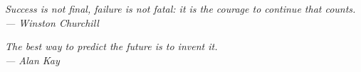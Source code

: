 \thispagestyle{empty}
\mbox{}
\begin{flushright}

{\selectfont
  \vspace{6cm}

  \it{
    Success is not final, failure is not fatal: it is the courage to continue that counts.
  }
  \\
  --- \textup{Winston Churchill}
  
  \vspace{3cm}
  
  \it{
    The best way to predict the future is to invent it.
  }
  \\
  --- \textup{Alan Kay}
}
\end{flushright}
